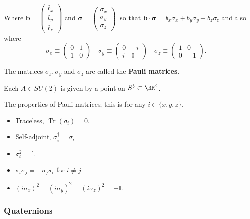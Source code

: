 \documentclass[12pt, a4paper]{article}
\DeclareMathOperator{\Tr}{Tr}
\begin{document}
Where \(\bm{b}=\begin{pmatrix} b_x \\ b_y \\ b_z \end{pmatrix}\) and \(\bm{\sigma} = \begin{pmatrix} \sigma_x \\ \sigma_y \\ \sigma_z \end{pmatrix}\), so that \(\bm{b}\cdot \bm{\sigma} = b_x\sigma_x +b_y\sigma_y+b_z\sigma_z\) and also where
\[\sigma_x \equiv \begin{pmatrix} 0 & 1 \\ 1 &0 \end{pmatrix} \quad \sigma_y \equiv \begin{pmatrix} 0 & -i \\i & 0 \end{pmatrix} \quad \sigma_z \equiv \begin{pmatrix} 1 & 0 \\ 0 & -1 \end{pmatrix}.\]

\begin{definition}
    The matrices \(\sigma_x,\sigma_y\) and \(\sigma_z\) are called the \textbf{Pauli matrices}.
\end{definition}

\begin{theorem}
    Each \(A\in SU(2)\) is given by a point on \(S^3 \subset \RR^4\).
\end{theorem}

\begin{mdthm}
    The properties of Pauli matrices; this is for any \(i \in \{x,y,z\}\).
    \begin{itemize}
        \item Traceless, \(\Tr(\sigma_i)=0\).
        \item Self-adjoint, \(\sigma_i^{\dagger}=\sigma_i\)
        \item \(\sigma_i^2 = \mathbb{I}\).
        \item \(\sigma_i \sigma_j = -\sigma_j\sigma_i\) for \(i \neq j\).
        \item \((i\sigma_x)^2=(i\sigma_y)^2=(i\sigma_z)^2=-\mathbb{I}\).
    \end{itemize}
\end{mdthm}

\subsubsection{Quaternions}
\end{document}
